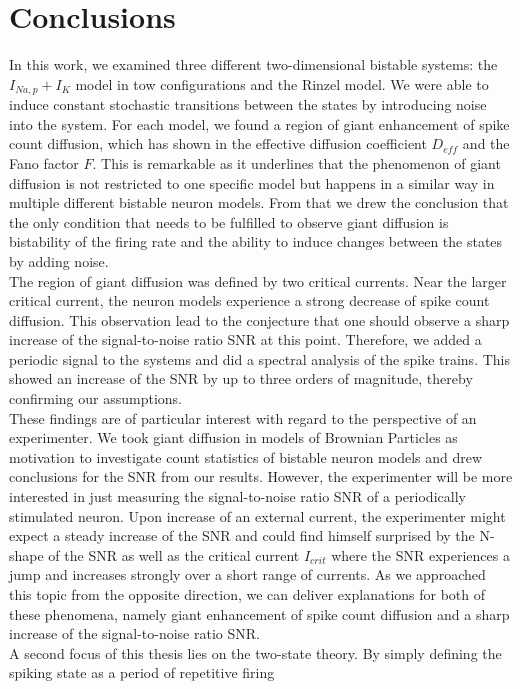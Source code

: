 \documentclass[12pt,a4paper]{article}
\begin{document}
\section{Conclusions}
In this work, we examined three different two-dimensional bistable systems: the $I_{Na,p}+I_K$ model in tow configurations and the Rinzel model. We were able to induce constant stochastic transitions between the states by introducing noise into the system. For each model, we found a region of giant enhancement of spike count diffusion, which has shown in the effective diffusion coefficient $D_{eff}$ and the Fano factor $F$. This is remarkable as it underlines that the phenomenon of giant diffusion is not restricted to one specific model but happens in a similar way in multiple different bistable neuron models. From that we drew the conclusion that the only condition that needs to be fulfilled to observe giant diffusion is bistability of the firing rate and the ability to induce changes between the states by adding noise. \\
The region of giant diffusion was defined by two critical currents. Near the larger critical current, the neuron models experience a strong decrease of spike count diffusion. This observation lead to the conjecture that one should observe a sharp increase of the signal-to-noise ratio SNR at this point. Therefore, we added a periodic signal to the systems and did a spectral analysis of the spike trains. This showed an increase of the SNR by up to three orders of magnitude, thereby confirming our assumptions.\\
These findings are of particular interest with regard to the perspective of an experimenter. We took giant diffusion in models of Brownian Particles as motivation to investigate count statistics of bistable neuron models and drew conclusions for the SNR from our results. However, the experimenter will be more interested in just measuring the signal-to-noise ratio SNR of a periodically stimulated neuron. Upon increase of an external current, the experimenter might expect a steady increase of the SNR and could find himself surprised by the N-shape of the SNR as well as the critical current $I_{crit}$ where the SNR experiences a jump and increases strongly over a short range of currents. As we approached this topic from the opposite direction, we can deliver explanations for both of these phenomena, namely giant enhancement of spike count diffusion and a sharp increase of the signal-to-noise ratio SNR.
\\
A second focus of this thesis lies on the two-state theory. By simply defining the spiking state as a period of repetitive firing
\end{document}
